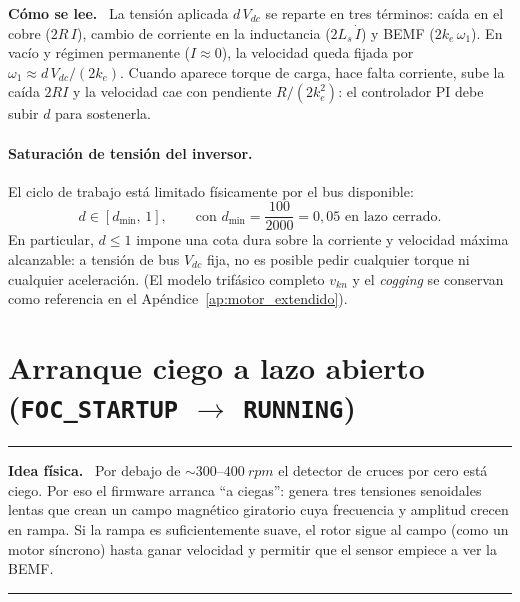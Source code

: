 \documentclass[11pt,a4paper,oneside]{report}
\theoremstyle{definition}
\theoremstyle{remark}
\newenvironment{idea}%
  {\par\medskip\noindent\begin{minipage}{\linewidth}\hrule\smallskip
   \noindent\textbf{Idea física.}\ }%
  {\smallskip\hrule\end{minipage}\par\medskip}
\newenvironment{lectura}%
  {\par\smallskip\noindent\textbf{Cómo se lee.}\ }%
  {\par\smallskip}
\begin{document}
\begin{lectura}
La tensión aplicada $d\,V_{dc}$ se reparte en tres términos: caída en el cobre
($2R\,I$), cambio de corriente en la inductancia ($2L_s\,\dot I$) y BEMF
($2k_e\,\omega_1$). En vacío y régimen permanente ($I\approx 0$), la velocidad
queda fijada por $\omega_1 \approx d\,V_{dc}/(2k_e)$. Cuando aparece torque de
carga, hace falta corriente, sube la caída $2RI$ y la velocidad cae con
pendiente $R/(2k_e^2)$: el controlador PI debe subir $d$ para sostenerla.
\end{lectura}

\paragraph{Saturación de tensión del inversor.} El ciclo de trabajo está
limitado físicamente por el bus disponible:
\begin{equation}
  d \in [d_{\min},\, 1], \qquad \text{con } d_{\min} = \frac{100}{2000} = 0{,}05
  \text{ en lazo cerrado.}
\end{equation}
En particular, $d\le 1$ impone una cota dura sobre la corriente y velocidad
máxima alcanzable: a tensión de bus $V_{dc}$ fija, no es posible pedir
cualquier torque ni cualquier aceleración. (El modelo trifásico completo
$v_{kn}$ y el \emph{cogging} se conservan como referencia en el
Apéndice~\ref{ap:motor_extendido}).

\section{Arranque ciego a lazo abierto (\texorpdfstring{\texttt{FOC\_STARTUP} $\to$ \texttt{RUNNING}}{FOC\_STARTUP -> RUNNING})}
\label{sec:arranque}

\begin{idea}
Por debajo de $\sim 300\text{--}\SI{400}{rpm}$ el detector de cruces por cero
está ciego. Por eso el firmware arranca ``a ciegas'': genera tres tensiones
senoidales lentas que crean un campo magnético giratorio cuya frecuencia y
amplitud crecen en rampa. Si la rampa es suficientemente suave, el rotor sigue
al campo (como un motor síncrono) hasta ganar velocidad y permitir que el
sensor empiece a ver la BEMF.
\end{idea}
\end{document}
